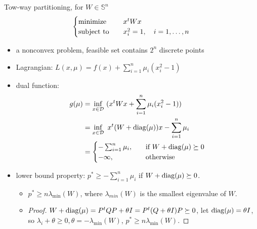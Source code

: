 \begin{remark}
    Tow-way partitioning, for $W \in \mathbb{S}^n$ \[\begin{cases}
        \operatorname{minimize} \quad &x^tWx\\
        \operatorname{subject\ to} \quad &x_i^2 = 1, \quad i = 1, \dots, n
    \end{cases}\]
    \begin{itemize}
        \item a nonconvex problem, feasible set contains $2^n$ discrete points
        \item Lagrangian: $L(x, \mu) = f(x) + \sum_{i = 1}^n\mu_i(x_i^2 - 1)$
        \item dual function:\begin{align*}
            g(\mu) &= \inf_{x \in \mathcal{D}}\ (x^tWx + \sum_{i = 1}^n \mu_i(x_i^2 - 1))\\
            &= \inf_{x \in \mathcal{D}}\ x^t(W + \operatorname{diag}(\mu))x - \sum_{i = 1}^n\mu_i\\
            &=\begin{cases}
                -\sum_{i = 1}^n \mu_i, \quad &\text{if } W + \operatorname{diag}(\mu) \succeq 0\\
                -\infty, \quad &\text{otherwise}
            \end{cases}
        \end{align*}
        \item lower bound property: $p^* \ge -\sum_{i = 1}^n \mu_i$ if $W + \operatorname{diag}(\mu) \succeq 0$.\begin{itemize}
            \item $p^* \ge n\lambda_{\min}(W)$, where $\lambda_{min}(W)$ is the smallest eigenvalue of $W$.
            \item \begin{proof}
                $W + \operatorname{diag}(\mu) = P^tQP + \theta I = P^t(Q + \theta I)P \succeq 0$, let $\operatorname{diag}(\mu) = \theta I$, so $\lambda_i + \theta \ge 0, \theta = -\lambda_{\min}(W)$, $p^* \ge n\lambda_{\min}(W)$.
            \end{proof}
        \end{itemize}
    \end{itemize}
\end{remark}

